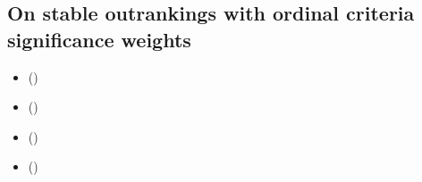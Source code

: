 \documentclass[a4paper,12pt,english]{sphinxhowto}
\begin{document}
\subsection{On stable outrankings with ordinal criteria significance weights}
\label{\detokenize{pearls:on-stable-outrankings-with-ordinal-criteria-significance-weights}}\label{\detokenize{pearls:stable-outranking-tutorial-label}}
\begin{sphinxcontents}
\begin{itemize}
\item {} 
\sphinxAtStartPar
{}\label{\detokenize{pearls:id112}}{\hyperref[\detokenize{pearls:cardinal-or-ordinal-criteria-significance-weights}]{}} ()

\item {} 
\sphinxAtStartPar
{}\label{\detokenize{pearls:id113}}{\hyperref[\detokenize{pearls:qualifying-the-stability-of-outranking-situations}]{}} ()

\item {} 
\sphinxAtStartPar
{}\label{\detokenize{pearls:id114}}{\hyperref[\detokenize{pearls:computing-the-stability-denotation-of-outranking-situations}]{}} ()

\item {} 
\sphinxAtStartPar
{}\label{\detokenize{pearls:id115}}{\hyperref[\detokenize{pearls:robust-bipolar-valued-outranking-digraphs}]{}} ()

\end{itemize}
\end{sphinxcontents}
\end{document}
